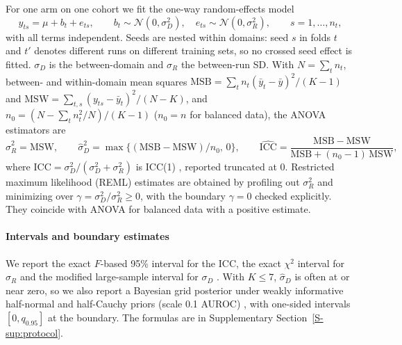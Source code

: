 For one arm on one cohort we fit the one-way random-effects model
\begin{equation}
  y_{ts}=\mu+b_t+e_{ts},\qquad b_t\sim\mathcal N(0,\sigma_D^2),\quad
  e_{ts}\sim\mathcal N(0,\sigma_R^2),\qquad s=1,\dots,n_t,
  \label{eq:oneway}
\end{equation}
with all terms independent. Seeds are nested within domains: seed $s$ in
folds $t$ and $t'$ denotes different runs on different training sets, so no
crossed seed effect is fitted. $\sigma_D$ is the between-domain and $\sigma_R$
the between-run SD. With $N=\sum_t n_t$, between- and within-domain mean
squares $\mathrm{MSB}=\sum_t n_t(\bar y_t-\bar y)^2/(K-1)$ and
$\mathrm{MSW}=\sum_{t,s}(y_{ts}-\bar y_t)^2/(N-K)$, and
$n_0=(N-\sum_t n_t^2/N)/(K-1)$ ($n_0=n$ for balanced data), the ANOVA
estimators \citep{searle1992variance} are
\begin{equation}
  \hat\sigma_R^2=\mathrm{MSW},\qquad
  \hat\sigma_D^2=\max\{(\mathrm{MSB}-\mathrm{MSW})/n_0,\,0\},\qquad
  \widehat{\mathrm{ICC}}=\frac{\mathrm{MSB}-\mathrm{MSW}}{\mathrm{MSB}+(n_0-1)\,\mathrm{MSW}},
  \label{eq:anova}
\end{equation}
where $\mathrm{ICC}=\sigma_D^2/(\sigma_D^2+\sigma_R^2)$ is ICC(1)
\citep{shrout1979icc,mcgraw1996icc}, reported truncated at 0. Restricted
maximum likelihood (REML) estimates \citep{patterson1971reml} are obtained by
profiling out $\sigma_R^2$ and minimizing over $\gamma=\sigma_D^2/\sigma_R^2\ge0$,
with the boundary $\gamma=0$ checked explicitly. They coincide with ANOVA for
balanced data with a positive estimate.

\paragraph{Intervals and boundary estimates} We report the exact $F$-based
95\% interval for the ICC, the exact $\chi^2$ interval for $\sigma_R$ and the
modified large-sample interval for $\sigma_D$
\citep{searle1992variance,mcgraw1996icc,burdick1992confidence}. With $K\le7$,
$\hat\sigma_D$ is often at or near zero, so we also report a Bayesian grid
posterior under weakly informative half-normal and half-Cauchy priors (scale
0.1 AUROC) \citep{gelman2006prior}, with one-sided intervals $[0,q_{0.95}]$ at
the boundary. The formulas are in Supplementary
Section~\ref{S-sup:protocol}.

